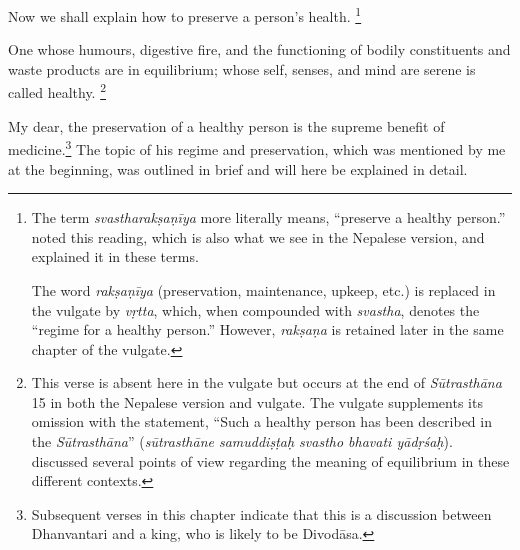 \begin{translation}

	\item [1]
	Now we shall explain how to preserve a person's health.%
	\footnote{The term \emph{svastharakṣaṇīya} more literally means, ``preserve a healthy person.''  noted this reading, which is also what we see in the Nepalese version, and explained it in these terms.

		The word \emph{rakṣaṇīya} (preservation, maintenance, upkeep, etc.) is replaced in the vulgate \citep[808]{vulgate} by \emph{vṛtta}, which, when compounded with \emph{svastha}, denotes the “regime for a healthy person.” However, \emph{rakṣaṇa} is retained later in the same chapter of the vulgate.}

	\item [2]
	One whose humours, digestive fire, and the functioning of bodily constituents and waste products are in equilibrium; whose self, senses, and mind are serene is called healthy.%
	\footnote{This verse is absent here in the vulgate but occurs at the end of \emph{Sūtrasthāna} 15 in both the Nepalese version and vulgate. The vulgate \citep[808]{vulgate} supplements its omission with the statement, ``Such a healthy person has been described in the \emph{Sūtrasthāna}'' (\emph{sūtrasthāne samuddiṣṭaḥ svastho bhavati yādṛśaḥ}).  discussed several points of view regarding the meaning of equilibrium in these different contexts.}

	\item [3]
	My dear, the preservation of a healthy person is the supreme benefit of medicine.\footnote{%
		Subsequent verses in this chapter indicate that this is a discussion between Dhanvantari and a king, who is likely to be Divodāsa.} %
	The topic of his regime and preservation, which was mentioned by me at the beginning, was outlined in brief and will here be explained in detail.


\end{translation}
